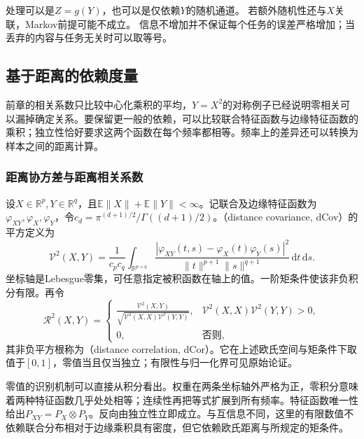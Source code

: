 处理可以是\(Z=g(Y)\)，也可以是仅依赖\(Y\)的随机通道。
若额外随机性还与\(X\)关联，Markov前提可能不成立。
信息不增加并不保证每个任务的误差严格增加；当丢弃的内容与任务无关时可以取等号。

\subsection{基于距离的依赖度量}
\label{sec:information-distance-dependence}

前章的相关系数只比较中心化乘积的平均，\(Y=X^2\)的对称例子已经说明零相关可以漏掉确定关系。要保留更一般的依赖，可以比较联合特征函数与边缘特征函数的乘积；独立性恰好要求这两个函数在每个频率都相等。频率上的差异还可以转换为样本之间的距离计算。

\subsubsection{距离协方差与距离相关系数}
设\(X\in\mathbb R^p,Y\in\mathbb R^q\)，且\(\mathbb E\|X\|+\mathbb E\|Y\|<\infty\)。记联合及边缘特征函数为\(\varphi_{XY},\varphi_X,\varphi_Y\)，令\(c_d=\pi^{(d+1)/2}/\Gamma((d+1)/2)\)。（distance covariance, dCov）的平方定义为
\begin{equation}
 \mathcal V^2(X,Y)
 =\frac1{c_pc_q}\int_{\mathbb R^{p+q}}
 \frac{|\varphi_{XY}(t,s)-\varphi_X(t)\varphi_Y(s)|^2}
 {\|t\|^{p+1}\|s\|^{q+1}}\,\mathrm dt\,\mathrm ds.
 \label{eq:information-distance-covariance}
\end{equation}
坐标轴是Lebesgue零集，可任意指定被积函数在轴上的值。一阶矩条件使该非负积分有限。再令
\[
 \mathcal R^2(X,Y)=
 \begin{cases}
 \displaystyle\frac{\mathcal V^2(X,Y)}
 {\sqrt{\mathcal V^2(X,X)\mathcal V^2(Y,Y)}},&
 \mathcal V^2(X,X)\mathcal V^2(Y,Y)>0,\\
 0,&\text{否则},
 \end{cases}
\]
其非负平方根称为（distance correlation, dCor）。它在上述欧氏空间与矩条件下取值于\([0,1]\)，零值当且仅当独立；有限性与归一化界可见原始论证。

零值的识别机制可以直接从积分看出。权重在两条坐标轴外严格为正，零积分意味着两种特征函数几乎处处相等；连续性再把等式扩展到所有频率。特征函数唯一性给出\(P_{XY}=P_X\otimes P_Y\)。反向由独立性立即成立。与互信息不同，这里的有限数值不依赖联合分布相对于边缘乘积具有密度，但它依赖欧氏距离与所规定的矩条件。

